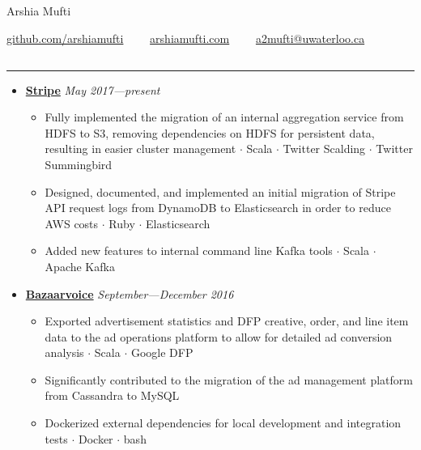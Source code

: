 \documentclass[5pt,letterpaper]{article}
\newcommand{\dt}{$\cdot$ }
\begin{document}
\begin{center}
  {\huge Arshia Mufti}


  \href{https://github.com/arshiamufti/}{github.com/arshiamufti}\ \ \textbullet
  \ \ \href{http://arshiamufti.com}{arshiamufti.com}\ \ \textbullet
  \ \ \href{mailto:a2mufti@uwaterloo.ca}{a2mufti@uwaterloo.ca}

\end{center}
\vspace{-2.0em}
\subsection*{}
\hrule
\vspace{1.0em}
\begin{itemize}[leftmargin=1em, noitemsep]

  \item[]
    {\href{https://stripe.com}{\textbf{Stripe}} \hfill
    \emph{May 2017---present}}

    \begin{itemize}[label=\textbullet, noitemsep, nosep]
      \item Fully implemented the migration of an internal aggregation service
        from HDFS to S3, removing dependencies on HDFS for persistent data, resulting in easier cluster
        management \dt Scala \dt Twitter Scalding \dt Twitter Summingbird
      \item Designed, documented, and implemented an initial migration of Stripe
        API request logs from DynamoDB to Elasticsearch in order to reduce AWS
        costs \dt Ruby \dt Elasticsearch
      \item Added new features to internal command line Kafka tools \dt Scala \dt Apache Kafka
    \end{itemize}

  \item[]
    {\href{http://www.bazaarvoice.com}{\textbf{Bazaarvoice}} \hfill
    \emph{September---December 2016}}

    \begin{itemize}[label=\textbullet, noitemsep, nosep]
      \item Exported advertisement statistics and DFP creative, order, and line
        item data to the ad operations platform to allow for detailed ad
        conversion analysis \dt Scala \dt Google DFP
      \item Significantly contributed to the migration of the ad
        management platform from Cassandra to MySQL
      \item Dockerized external dependencies for local development and
        integration tests \dt Docker \dt bash
    \end{itemize}


\end{itemize}
\end{document}
